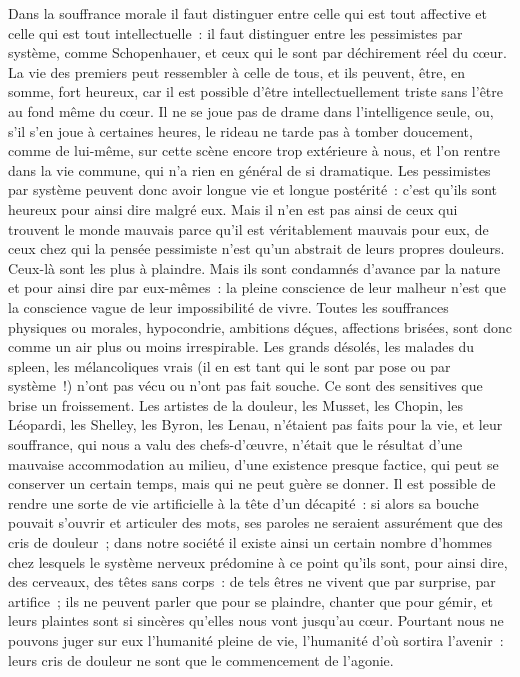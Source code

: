 \documentclass[french,twoside]{book} %
\begin{document}
Dans la souffrance morale il faut distinguer entre celle qui est tout affective et celle qui est tout intellectuelle : il faut distinguer entre les pessimistes par système, comme Schopenhauer, et ceux qui le sont par déchirement réel du cœur. La vie des premiers peut ressembler à celle de tous, et ils peuvent, être, en somme, fort heureux, car il est possible d’être intellectuellement triste sans l’être au fond même du cœur. Il ne se joue pas de drame dans l’intelligence seule, ou, s’il s’en joue à certaines heures, le rideau ne tarde pas à tomber doucement, comme de lui-même, sur cette scène encore trop extérieure à nous, et l’on rentre dans la vie commune, qui n’a rien en général de si dramatique. Les pessimistes par système peuvent donc avoir longue vie et longue postérité : c’est qu’ils sont heureux pour ainsi dire malgré eux. Mais il n’en est pas ainsi de ceux qui trouvent le monde mauvais parce qu’il est véritablement mauvais pour eux, de ceux chez qui la pensée pessimiste n’est qu’un abstrait de leurs propres douleurs. Ceux-là sont les plus à plaindre. Mais ils sont condamnés d’avance par la nature et pour ainsi dire par eux-mêmes : la pleine conscience de leur malheur n’est que la conscience vague de leur impossibilité de vivre. Toutes les souffrances physiques ou morales, hypocondrie, ambitions déçues, affections brisées, sont donc comme un air plus ou moins irrespirable. Les grands désolés, les malades du spleen, les mélancoliques vrais (il en est tant qui le sont par pose ou par système !) n’ont pas vécu ou n’ont pas fait souche. Ce sont des sensitives que brise un froissement. Les artistes de la douleur, les Musset, les Chopin, les Léopardi, les Shelley, les Byron, les Lenau, n’étaient pas faits pour la vie, et leur souffrance, qui nous a valu des chefs-d’œuvre, n’était que le résultat d’une mauvaise accommodation au milieu, d’une existence presque factice, qui peut se conserver un certain temps, mais qui ne peut guère se donner. Il est possible de rendre une sorte de vie artificielle à la tête d’un décapité : si alors sa bouche pouvait s’ouvrir et articuler des mots, ses paroles ne seraient assurément que des cris de douleur ; dans notre société il existe ainsi un certain nombre d’hommes chez lesquels le système nerveux prédomine à ce point qu’ils sont, pour ainsi dire, des cerveaux, des têtes sans corps : de tels êtres ne vivent que par surprise, par artifice ; ils ne peuvent parler que pour se plaindre, chanter que pour gémir, et leurs plaintes sont si sincères qu’elles nous vont jusqu’au cœur. Pourtant nous ne pouvons juger sur eux l’humanité pleine de vie, l’humanité d’où sortira l’avenir : leurs cris de douleur ne sont que le commencement de l’agonie.\par
\end{document}
